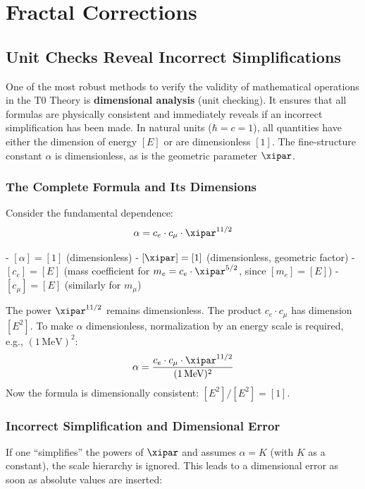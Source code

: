 	\section{Fractal Corrections}
	\subsection{Unit Checks Reveal Incorrect Simplifications}
	
	One of the most robust methods to verify the validity of mathematical operations in the T0 Theory is \textbf{dimensional analysis} (unit checking). It ensures that all formulas are physically consistent and immediately reveals if an incorrect simplification has been made. In natural units ($\hbar = c = 1$), all quantities have either the dimension of energy $[E]$ or are dimensionless $[1]$. The fine-structure constant $\alpha$ is dimensionless, as is the geometric parameter $\xipar$.
	
	\subsubsection{The Complete Formula and Its Dimensions}
	
	Consider the fundamental dependence:
	\begin{equation}
		\alpha = c_e \cdot c_\mu \cdot \xipar^{11/2}
		\label{eq:full_with_dims}
	\end{equation}
	
	- $[\alpha] = [1]$ (dimensionless)
	- $[\xipar] = [1]$ (dimensionless, geometric factor)
	- $[c_e] = [E]$ (mass coefficient for $m_e = c_e \cdot \xipar^{5/2}$, since $[m_e] = [E]$)
	- $[c_\mu] = [E]$ (similarly for $m_\mu$)
	
	The power $\xipar^{11/2}$ remains dimensionless. The product $c_e \cdot c_\mu$ has dimension $[E^2]$. To make $\alpha$ dimensionless, normalization by an energy scale is required, e.g., $(1\,\text{MeV})^2$:
	\begin{equation}
		\alpha = \frac{c_e \cdot c_\mu \cdot \xipar^{11/2}}{(1\,\text{MeV})^2}
	\end{equation}
	Now the formula is dimensionally consistent: $[E^2] / [E^2] = [1]$.
	
	\subsubsection{Incorrect Simplification and Dimensional Error}
	
	If one ``simplifies'' the powers of $\xipar$ and assumes $\alpha = K$ (with $K$ as a constant), the scale hierarchy is ignored. This leads to a dimensional error as soon as absolute values are inserted:
	
